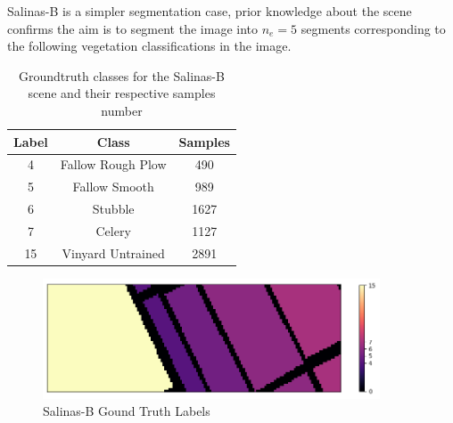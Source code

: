Salinas-B is a simpler segmentation case, prior knowledge about the scene confirms the aim is to segment the image into $n_e = 5$ segments corresponding to the following vegetation classifications in the image.
\begin{table}[H]
    \centering
    \label{tab:salinas_b_classes}
    \begin{tabular}{|c|c|c|}
    \hline
    \textbf{Label} & \textbf{Class} & \textbf{Samples} \\
    \hline
    4 & Fallow Rough Plow & 490 \\
    5 & Fallow Smooth & 989 \\
    6 & Stubble & 1627 \\
    7 & Celery & 1127 \\
    15 & Vinyard Untrained  & 2891 \\
    \hline
    \end{tabular}
    \caption{Groundtruth classes for the Salinas-B scene and their respective samples number}
\end{table}
\begin{figure}[H]
    \centering
    \includegraphics[width=10cm]{salinas-b-gt.png}  %
    \caption{Salinas-B Gound Truth Labels}
    \label{salina-b}  %
\end{figure}


